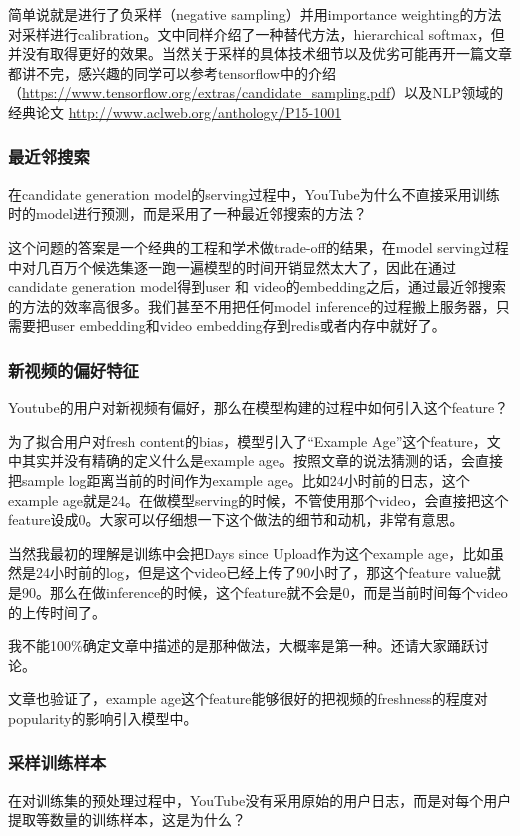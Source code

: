 \documentclass[12pt]{article}
\begin{document}
简单说就是进行了负采样（negative sampling）并用importance weighting的方法对采样进行calibration。文中同样介绍了一种替代方法，hierarchical softmax，但并没有取得更好的效果。当然关于采样的具体技术细节以及优劣可能再开一篇文章都讲不完，感兴趣的同学可以参考tensorflow中的介绍（\url{https://www.tensorflow.org/extras/candidate_sampling.pdf}）以及NLP领域的经典论文 \url{http://www.aclweb.org/anthology/P15-1001}

\subsubsection{最近邻搜索}
在candidate generation model的serving过程中，YouTube为什么不直接采用训练时的model进行预测，而是采用了一种最近邻搜索的方法？

这个问题的答案是一个经典的工程和学术做trade-off的结果，在model serving过程中对几百万个候选集逐一跑一遍模型的时间开销显然太大了，因此在通过candidate generation model得到user 和 video的embedding之后，通过最近邻搜索的方法的效率高很多。我们甚至不用把任何model inference的过程搬上服务器，只需要把user embedding和video embedding存到redis或者内存中就好了。

\subsubsection{新视频的偏好特征}
Youtube的用户对新视频有偏好，那么在模型构建的过程中如何引入这个feature？

为了拟合用户对fresh content的bias，模型引入了“Example Age”这个feature，文中其实并没有精确的定义什么是example age。按照文章的说法猜测的话，会直接把sample log距离当前的时间作为example age。比如24小时前的日志，这个example age就是24。在做模型serving的时候，不管使用那个video，会直接把这个feature设成0。大家可以仔细想一下这个做法的细节和动机，非常有意思。

当然我最初的理解是训练中会把Days since Upload作为这个example age，比如虽然是24小时前的log，但是这个video已经上传了90小时了，那这个feature value就是90。那么在做inference的时候，这个feature就不会是0，而是当前时间每个video的上传时间了。

我不能100\%确定文章中描述的是那种做法，大概率是第一种。还请大家踊跃讨论。

文章也验证了，example age这个feature能够很好的把视频的freshness的程度对popularity的影响引入模型中。

\subsubsection{采样训练样本}
在对训练集的预处理过程中，YouTube没有采用原始的用户日志，而是对每个用户提取等数量的训练样本，这是为什么？
\end{document}
